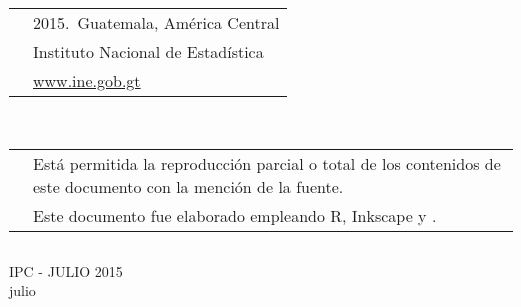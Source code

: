 
\renewcommand{\titulodoc}{IPC  -  julio 2015}
\usepackage{booktabs}
\usepackage{multirow} 
\usepackage{lscape} 


\newcommand{\ra}[1]{\renewcommand{\arraystretch}{#1}}

\newcommand{\mesreportado}{julio}
\newcommand{\varmens}{0.21}
\newcommand{\varanu}{2.43}
\newcommand{\varacu}{0.17}





$\ $
\vspace{14.5cm}

\noindent\begin{tabular}{p{0.9cm}p{6.8cm}}
	& 2015.$\,$ Guatemala, América Central \\
	&\Bold Instituto Nacional de Estadística\\[-0.4cm]
	&\color{blue!50!black}\url{www.ine.gob.gt}\\[0.9cm]
\end{tabular}\\
\noindent\begin{tabular}{p{0.9cm}p{6.8cm}}
	& Está permitida la reproducción parcial o total de los contenidos de este documento con la mención de la fuente. \\[0.5cm]
	
	& Este documento fue elaborado empleando  {\Sans R}, Inkscape y {\Logos \XeLaTeX}.\\
\end{tabular} 


\clearpage$\ $
\vspace{7cm}

\begin{center}
	\Bold \LARGE {\MakeUppercase{\titulodoc}} \\
\mesreportado 
\end{center}
\cleardoublepage
	$\ $
	\vspace{0.0cm}
	
